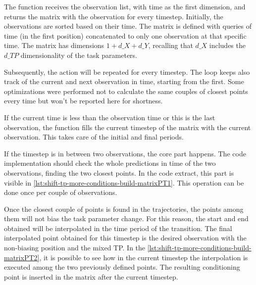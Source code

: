 The function receives the observation list, with time as the first dimension, and returns the matrix with the observation for every timestep. Initially, the observations are sorted based on their time. The matrix is defined with queries of time (in the first position) concatenated to only one observation at that specific time. The matrix has dimensions $1+d\_X+d\_Y$, recalling that $d\_X$ includes the $d\_TP$ dimensionality of the task parameters. 

Subsequently, the action will be repeated for every timestep. The loop keeps also track of the current and next observation in time, starting from the first. Some optimizations were performed not to calculate the same couples of closest points every time but won't be reported here for shortness. 

If the current time is less than the observation time or this is the last observation, the function fills the current timestep of the matrix with the current observation. This takes care of the initial and final periods.

If the timestep is in between two observations, the core part happens. The code implementation should check the whole predictions in time of the two observations, finding the two closest points. In the code extract, this part is visible in \cref{lst:shift-tp-more-conditions-build-matrixPT1}. This operation can be done once per couple of observations. 



Once the closest couple of points is found in the trajectories, the points among them will not bias the task parameter change. For this reason, the start and end obtained will be interpolated in the time period of the transition. The final interpolated point obtained for this timestep is the desired observation with the non-biasing position and the mixed TP. In the \cref{lst:shift-tp-more-conditions-build-matrixPT2}, it is possible to see how in the current timestep the interpolation is executed among the two previously defined points. The resulting conditioning point is inserted in the matrix after the current timestep.



